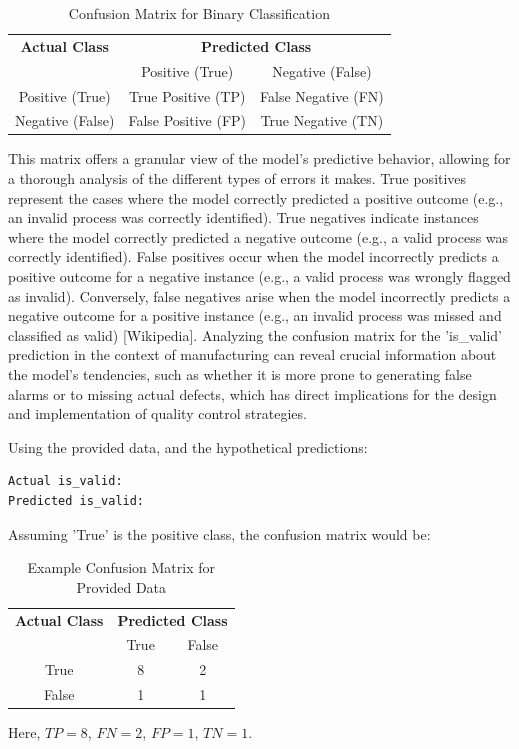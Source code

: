 \begin{table}[h!]
  \centering
  \caption{Confusion Matrix for Binary Classification}
  \label{tab:confusion_matrix}
  \begin{tabular}{c|cc}
    \toprule
    \textbf{Actual Class} & \multicolumn{2}{c}{\textbf{Predicted Class}}                       \\
                          & Positive (True)                              & Negative (False)    \\
    \midrule
    Positive (True)       & True Positive (TP)                           & False Negative (FN) \\
    Negative (False)      & False Positive (FP)                          & True Negative (TN)  \\
    \bottomrule
  \end{tabular}
\end{table}

This matrix offers a granular view of the model's predictive behavior, allowing for a thorough analysis of the different types of errors it makes. True positives represent the cases where the model correctly predicted a positive outcome (e.g., an invalid process was correctly identified). True negatives indicate instances where the model correctly predicted a negative outcome (e.g., a valid process was correctly identified). False positives occur when the model incorrectly predicts a positive outcome for a negative instance (e.g., a valid process was wrongly flagged as invalid). Conversely, false negatives arise when the model incorrectly predicts a negative outcome for a positive instance (e.g., an invalid process was missed and classified as valid) [Wikipedia]. Analyzing the confusion matrix for the 'is\_valid' prediction in the context of manufacturing can reveal crucial information about the model's tendencies, such as whether it is more prone to generating false alarms or to missing actual defects, which has direct implications for the design and implementation of quality control strategies.

Using the provided data, and the hypothetical predictions:
\begin{verbatim}
Actual is_valid: 
Predicted is_valid:
\end{verbatim}
Assuming 'True' is the positive class, the confusion matrix would be:
\begin{table}[h!]
  \centering
  \caption{Example Confusion Matrix for Provided Data}
  \label{tab:example_confusion_matrix_data}
  \begin{tabular}{c|cc}
    \toprule
    \textbf{Actual Class} & \multicolumn{2}{c}{\textbf{Predicted Class}}         \\
                          & True                                         & False \\
    \midrule
    True                  & 8                                            & 2     \\
    False                 & 1                                            & 1     \\
    \bottomrule
  \end{tabular}
\end{table}
Here, $TP=8$, $FN=2$, $FP=1$, $TN=1$.

